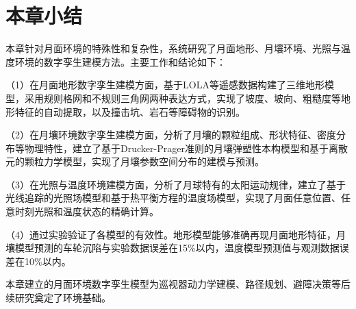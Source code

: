 \section{本章小结}
\label{sec:ch3_summary}

本章针对月面环境的特殊性和复杂性，系统研究了月面地形、月壤环境、光照与温度环境的数字孪生建模方法。主要工作和结论如下：

（1）在月面地形数字孪生建模方面，基于LOLA等遥感数据构建了三维地形模型，采用规则格网和不规则三角网两种表达方式，实现了坡度、坡向、粗糙度等地形特征的自动提取，以及撞击坑、岩石等障碍物的识别。

（2）在月壤环境数字孪生建模方面，分析了月壤的颗粒组成、形状特征、密度分布等物理特性，建立了基于Drucker-Prager准则的月壤弹塑性本构模型和基于离散元的颗粒力学模型，实现了月壤参数空间分布的建模与预测。

（3）在光照与温度环境建模方面，分析了月球特有的太阳运动规律，建立了基于光线追踪的光照场模型和基于热平衡方程的温度场模型，实现了月面任意位置、任意时刻光照和温度状态的精确计算。

（4）通过实验验证了各模型的有效性。地形模型能够准确再现月面地形特征，月壤模型预测的车轮沉陷与实验数据误差在15\%以内，温度模型预测值与观测数据误差在10\%以内。

本章建立的月面环境数字孪生模型为巡视器动力学建模、路径规划、避障决策等后续研究奠定了环境基础。
